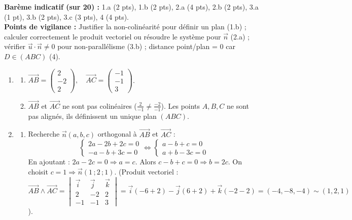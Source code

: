 \documentclass[11pt]{article}
\begin{document}
\begin{corrige}
\textbf{Barème indicatif (sur 20) :} 1.a (2 pts), 1.b (2 pts), 2.a (4 pts), 2.b (2 pts), 3.a (1 pt), 3.b (2 pts), 3.c (3 pts), 4 (4 pts).\\
\textbf{Points de vigilance :} Justifier la non-colinéarité pour définir un plan (1.b) ; calculer correctement le produit vectoriel ou résoudre le système pour $\vec{n}$ (2.a) ; vérifier $\vec{u}\cdot\vec{n}\neq 0$ pour non-parallélisme (3.b) ; distance point/plan = 0 car $D\in(ABC)$ (4).

\begin{enumerate}
\item \begin{enumerate}
\item $\overrightarrow{AB} = \begin{pmatrix}2 \\ -2 \\ 2\end{pmatrix},\quad \overrightarrow{AC} = \begin{pmatrix}-1 \\ -1 \\ 3\end{pmatrix}$.
\item $\overrightarrow{AB}$ et $\overrightarrow{AC}$ ne sont pas colinéaires ($\frac{2}{-1}\neq\frac{-2}{-1}$). Les points $A,B,C$ ne sont pas alignés, ils définissent un unique plan $(ABC)$.
\end{enumerate}
\item \begin{enumerate}
\item Recherche $\vec{n}(a,b,c)$ orthogonal à $\overrightarrow{AB}$ et $\overrightarrow{AC}$ :
\[
\begin{cases}
2a - 2b + 2c = 0 \\
-a - b + 3c = 0
\end{cases}
\iff
\begin{cases}
a - b + c = 0 \\
a + b - 3c = 0
\end{cases}
\]
En ajoutant : $2a - 2c = 0 \Rightarrow a = c$. Alors $c - b + c = 0 \Rightarrow b = 2c$.
On choisit $c=1 \Rightarrow \vec{n}(1\,;2\,;1)$.
(Produit vectoriel : $\overrightarrow{AB}\wedge\overrightarrow{AC} = \begin{vmatrix}\vec{i}&\vec{j}&\vec{k}\\2&-2&2\\-1&-1&3\end{vmatrix} = \vec{i}(-6+2) - \vec{j}(6+2) + \vec{k}(-2-2) = (-4,-8,-4) \sim (1,2,1)$).

\end{enumerate}
\end{enumerate}
\end{corrige}
\end{document}
